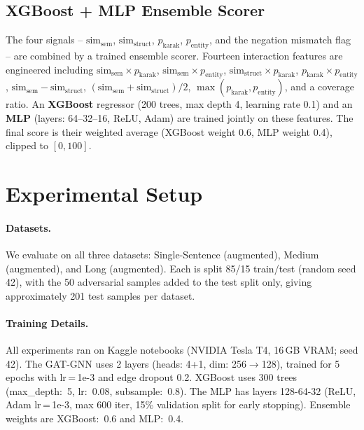 \documentclass[11pt]{article}
\begin{document}
\subsection{XGBoost + MLP Ensemble Scorer}

The four signals -- $\mathrm{sim}_\mathrm{sem}$, $\mathrm{sim}_\mathrm{struct}$, $p_\mathrm{karak}$, $p_\mathrm{entity}$, and the negation mismatch flag -- are combined by a trained ensemble scorer. Fourteen interaction features are engineered including $\mathrm{sim}_\mathrm{sem} \times p_\mathrm{karak}$, $\mathrm{sim}_\mathrm{sem} \times p_\mathrm{entity}$, $\mathrm{sim}_\mathrm{struct} \times p_\mathrm{karak}$, $p_\mathrm{karak} \times p_\mathrm{entity}$, $\mathrm{sim}_\mathrm{sem} - \mathrm{sim}_\mathrm{struct}$, $(\mathrm{sim}_\mathrm{sem} + \mathrm{sim}_\mathrm{struct})/2$, $\max(p_\mathrm{karak}, p_\mathrm{entity})$, and a coverage ratio. An \textbf{XGBoost} regressor \citep{chen2016xgboost} (200 trees, max depth 4, learning rate 0.1) and an \textbf{MLP} (layers: 64--32--16, ReLU, Adam) are trained jointly on these features. The final score is their weighted average (XGBoost weight 0.6, MLP weight 0.4), clipped to $[0, 100]$.


\section{Experimental Setup}

\paragraph{Datasets.} We evaluate on all three datasets: Single-Sentence (augmented), Medium (augmented), and Long (augmented). Each is split 85/15 train/test (random seed 42), with the 50 adversarial samples added to the test split only, giving approximately 201 test samples per dataset.

\paragraph{Training Details.} All experiments ran on Kaggle notebooks (NVIDIA Tesla T4, 16\,GB VRAM; seed 42). The GAT-GNN uses 2 layers (heads: 4+1, dim: 256$\to$128), trained for 5 epochs with lr\,=\,1e-3 and edge dropout 0.2. XGBoost uses 300 trees (max\_depth:~5, lr:~0.08, subsample:~0.8). The MLP has layers 128-64-32 (ReLU, Adam lr\,=\,1e-3, max 600 iter, 15\% validation split for early stopping). Ensemble weights are XGBoost:~0.6 and MLP:~0.4.
\end{document}
